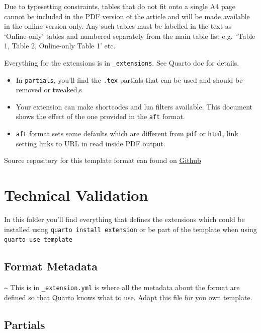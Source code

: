 \documentclass[fleqn,10pt]{wlscirep}
\begin{document}
Due to typesetting constraints, tables that do not fit onto a single A4
page cannot be included in the PDF version of the article and will be
made available in the online version only. Any such tables must be
labelled in the text as `Online-only' tables and numbered separately
from the main table list e.g.~`Table 1, Table 2, Online-only Table 1'
etc.

Everything for the extensions is in \texttt{\_extensions}. See Quarto
doc for details.

\begin{itemize}
\item
  In \texttt{partials}, you'll find the \texttt{.tex} partials that can
  be used and should be removed or tweaked,s
\item
  Your extension can make shortcodes and lua filters available. This
  document shows the effect of the one provided in the \texttt{aft}
  format.
\item
  \texttt{aft} format sets some defaults which are different from
  \texttt{pdf} or \texttt{html}, link setting links to URL in read
  inside PDF output.
\end{itemize}

Source repository for this template format can found on
\href{https://github.com/quarto-journals/article-format-template}{Github}

\hypertarget{technical-validation-1}{%
\section{Technical Validation}\label{technical-validation-1}}

In this folder you'll find everything that defines the extensions which
could be installed using \texttt{quarto\ install\ extension} or be part
of the template when using \texttt{quarto\ use\ template}

\hypertarget{format-metadata}{%
\subsection{Format Metadata}\label{format-metadata}}

\textasciitilde{} This is in \texttt{\_extension.yml} is where all the
metadata about the format are defined so that Quarto knows what to use.
Adapt this file for you own template.

\hypertarget{partials}{%
\subsection{Partials}\label{partials}}
\end{document}
